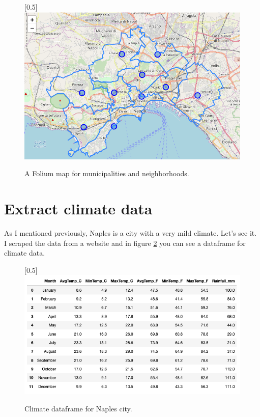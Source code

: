 \documentclass[a4paper, 12pt, oneside]{book}
\begin{document}
\begin{figure}[!htb]
		\centering
		\scalebox{0.45}[0.5]{\includegraphics{immagini/map_municipality.png}}
		\caption{A Folium map for municipalities and neighborhoods. }
		\label{fig:map_municipality}
	\end{figure}


\section*{Extract climate data} 
\label{sec:climate}
As I mentioned previously, Naples is a city with a very mild climate. Let's see it. I scraped the data from a website \cite{climate} and in figure \ref{fig:df_climate} you can see a dataframe for climate data.



\begin{figure}[!htb]
		\centering
		\scalebox{0.45}[0.5]{\includegraphics{immagini/df_climate.png}}
		\caption{Climate dataframe for Naples city. }
		\label{fig:df_climate}
	\end{figure}
\end{document}
